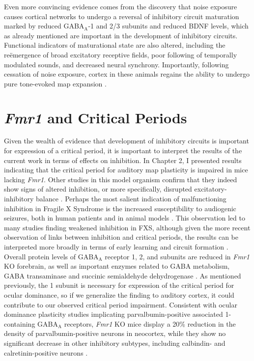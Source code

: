 Even more convincing evidence comes from the discovery that noise exposure causes cortical networks to undergo a reversal of inhibitory circuit maturation marked by reduced GABA$_\mathrm{A}$-\textalpha{}1 and \textbeta{}2/3 subunits and reduced BDNF levels, which as already mentioned are important in the development of inhibitory circuits. Functional indicators of maturational state are also altered, including the re\"emergence of broad excitatory receptive fields, poor following of temporally modulated sounds, and decreased neural synchrony. Importantly, following cessation of noise exposure, cortex in these animals regains the ability to undergo pure tone-evoked map expansion \cite{Zhou2011}.

\section{\textit{Fmr1} and Critical Periods}
Given the wealth of evidence that development of inhibitory circuits is important for expression of a critical period, it is important to interpret the results of the current work in terms of effects on inhibition. In Chapter 2, I presented results indicating that the critical period for auditory map plasticity is impaired in mice lacking \textit{Fmr1}. Other studies in this model organism confirm that they indeed show signs of altered inhibition, or more specifically, disrupted excitatory-inhibitory balance \cite{Gibson2008}. Perhaps the most salient indication of malfunctioning inhibition in Fragile X Syndrome is the increased susceptibility to audiogenic seizures, both in human patients and in animal models \cite{Hagerman, Chen2001}. This observation led to many studies finding weakened inhibition in FXS, although given the more recent observation of links between inhibition and critical periods, the results can be interpreted more broadly in terms of early learning and circuit formation \cite{ElIdrissi2005}. Overall protein levels of GABA$_\mathrm{A}$ receptor \textalpha{}1, \textbeta{}2, and \textdelta{} subunits are reduced in \textit{Fmr1} KO forebrain, as well as important enzymes related to GABA metabolism, GABA transaminase and succinic semialdehyde dehydrogenase \cite{Adusei2010}. As mentioned previously, the \textalpha{}1 subunit is necessary for expression of the critical period for ocular dominance, so if we generalize the finding to auditory cortex, it could contribute to our observed critical period impairment. Consistent with ocular dominance plasticity studies implicating parvalbumin-positive associated \textalpha{}1-containing GABA$_\mathrm{A}$ receptors, \textit{Fmr1} KO mice display a 20\% reduction in the density of parvalbumin-positive neurons in neocortex, while they show no significant decrease in other inhibitory subtypes, including calbindin- and calretinin-positive neurons \cite{Selby2007}.

